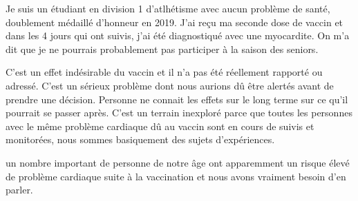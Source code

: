 Je suis un étudiant en division 1 d'atlhétisme avec aucun problème de santé,
doublement médaillé d'honneur en 2019. J'ai reçu ma seconde dose de vaccin et
dans les 4 jours qui ont suivis, j'ai été diagnostiqué avec une myocardite. On
m'a dit que je ne pourrais probablement pas participer à la saison des seniors.

C'est un effet indésirable du vaccin et il n'a pas été réellement rapporté ou
adressé. C'est un sérieux problème dont nous aurions dû être alertés avant de
prendre une décision. Personne ne connait les effets sur le long terme sur ce
qu'il pourrait se passer après. C'est un terrain inexploré parce que toutes les
personnes avec le même problème cardiaque dû au vaccin sont en cours de suivis
et monitorées, nous sommes basiquement des sujets d'expériences.

un nombre important de personne de notre âge ont apparemment un risque élevé de
problème cardiaque suite à la vaccination et nous avons vraiment besoin d'en
parler.

